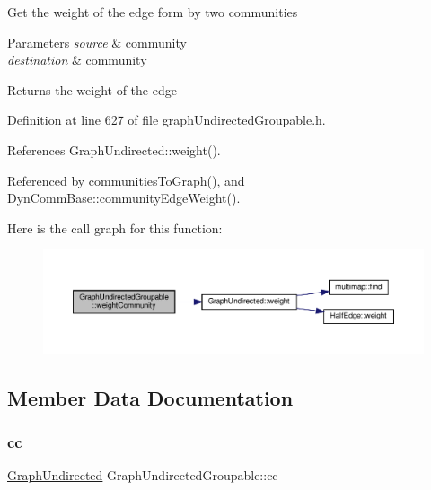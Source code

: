 Get the weight of the edge form by two communities


\begin{DoxyParams}{Parameters}
{\em source} & community \\
\hline
{\em destination} & community \\
\hline
\end{DoxyParams}
\begin{DoxyReturn}{Returns}
the weight of the edge 
\end{DoxyReturn}


Definition at line 627 of file graph\+Undirected\+Groupable.\+h.



References Graph\+Undirected\+::weight().



Referenced by communities\+To\+Graph(), and Dyn\+Comm\+Base\+::community\+Edge\+Weight().

Here is the call graph for this function\+:
\nopagebreak
\begin{figure}[H]
\begin{center}
\leavevmode
\includegraphics[width=350pt]{classGraphUndirectedGroupable_a2884361f00176ac8f16afca6feb3e404_cgraph}
\end{center}
\end{figure}


\subsection{Member Data Documentation}
\mbox{\label{classGraphUndirectedGroupable_aa76c119ec662942ae958b0463764a919}} 
\subsubsection{\texorpdfstring{cc}{cc}}
{\footnotesize\ttfamily \hyperlink{classGraphUndirected}{Graph\+Undirected} Graph\+Undirected\+Groupable\+::cc\hspace{0.3cm}{\ttfamily [private]}}



